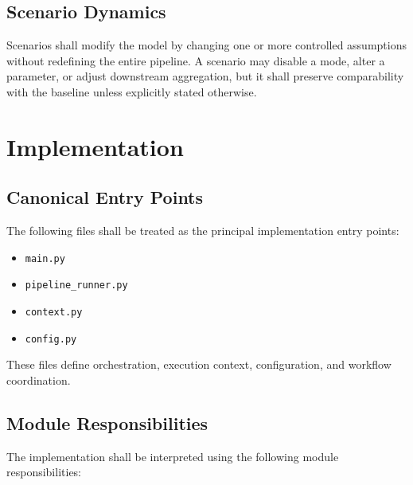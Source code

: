 \documentclass[11pt]{article}
\begin{document}
\subsection*{Scenario Dynamics}

Scenarios shall modify the model by changing one or more controlled assumptions without redefining the entire pipeline. A scenario may disable a mode, alter a parameter, or adjust downstream aggregation, but it shall preserve comparability with the baseline unless explicitly stated otherwise.

\section{Implementation}

\subsection*{Canonical Entry Points}

The following files shall be treated as the principal implementation entry points:

\begin{itemize}
  \item \texttt{main.py}
  \item \texttt{pipeline\_runner.py}
  \item \texttt{context.py}
  \item \texttt{config.py}
\end{itemize}

These files define orchestration, execution context, configuration, and workflow coordination.

\subsection*{Module Responsibilities}

The implementation shall be interpreted using the following module responsibilities:
\end{document}
